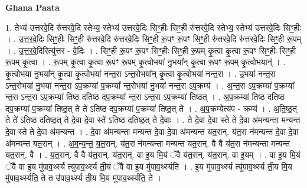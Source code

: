 \documentclass[17pt]{extarticle}
\begin{document}
\textbf{Ghana Paata } \newline

1. तेभ्य॑ उत्तरवे॒दि रु॑त्तरवे॒दि स्तेभ्य॒ स्तेभ्य॑ उत्तरवे॒दिः सिꣳ॒॒हीः सिꣳ॒॒ही रु॑त्तरवे॒दि स्तेभ्य॒ स्तेभ्य॑ उत्तरवे॒दिः सिꣳ॒॒हीः । . उ॒त्त॒र॒वे॒दिः सिꣳ॒॒हीः सिꣳ॒॒ही रु॑त्तरवे॒दि रु॑त्तरवे॒दिः सिꣳ॒॒ही रू॒पꣳ रू॒पꣳ सिꣳ॒॒ही रु॑त्तरवे॒दि रु॑त्तरवे॒दिः सिꣳ॒॒ही रू॒पम् । . उ॒त्त॒र॒वे॒दिरित्यु॑त्तर - वे॒दिः । . सिꣳ॒॒ही रू॒पꣳ रू॒पꣳ सिꣳ॒॒हीः सिꣳ॒॒ही रू॒पम् कृ॒त्वा कृ॒त्वा रू॒पꣳ सिꣳ॒॒हीः सिꣳ॒॒ही रू॒पम् कृ॒त्वा । . रू॒पम् कृ॒त्वा कृ॒त्वा रू॒पꣳ रू॒पम् कृ॒त्वोभया॑ नु॒भया᳚न् कृ॒त्वा रू॒पꣳ रू॒पम् कृ॒त्वोभयान्॑ । . कृ॒त्वोभया॑ नु॒भया᳚न् कृ॒त्वा कृ॒त्वोभया॑ नन्त॒रा ऽन्त॒रोभया᳚न् कृ॒त्वा कृ॒त्वोभया॑ नन्त॒रा । . उ॒भया॑ नन्त॒रा ऽन्त॒रोभया॑ नु॒भया॑ नन्त॒रा ऽप॒क्रम्या॑ प॒क्रम्या᳚ न्त॒रोभया॑ नु॒भया॑ नन्त॒रा ऽप॒क्रम्य॑ । . अ॒न्त॒रा ऽप॒क्रम्या॑ प॒क्रम्या᳚ न्त॒रा ऽन्त॒रा ऽप॒क्रम्या॑ तिष्ठ दतिष्ठ दप॒क्रम्या᳚ न्त॒रा ऽन्त॒रा ऽप॒क्रम्या॑ तिष्ठत् । . अ॒प॒क्रम्या॑ तिष्ठ दतिष्ठ दप॒क्रम्या॑ प॒क्रम्या॑ तिष्ठ॒त् ते ते॑ ऽतिष्ठ दप॒क्रम्या॑ प॒क्रम्या॑ तिष्ठ॒त् ते । . अ॒प॒क्रम्येत्य॑प - क्रम्य॑ । . अ॒ति॒ष्ठ॒त् ते ते॑ ऽतिष्ठ दतिष्ठ॒त् ते दे॒वा दे॒वा स्ते॑ ऽतिष्ठ दतिष्ठ॒त् ते दे॒वाः । . ते दे॒वा दे॒वा स्ते ते दे॒वा अ॑मन्यन्ता मन्यन्त दे॒वा स्ते ते दे॒वा अ॑मन्यन्त । . दे॒वा अ॑मन्यन्ता मन्यन्त दे॒वा दे॒वा अ॑मन्यन्त यत॒रान्. य॑त॒रा न॑मन्यन्त दे॒वा दे॒वा अ॑मन्यन्त यत॒रान् । . अ॒म॒न्य॒न्त॒ य॒त॒रान्. य॑त॒रा न॑मन्यन्ता मन्यन्त यत॒रान्. वै वै य॑त॒रा न॑मन्यन्ता मन्यन्त यत॒रान्. वै । . य॒त॒रान्. वै वै य॑त॒रान्. य॑त॒रान्. वा इ॒य मि॒यं ॅवै य॑त॒रान्. य॑त॒रान्. वा इ॒यम् । . वा इ॒य मि॒यं ॅवै वा इ॒य मु॑पाव॒र्थ्स्य त्यु॑पाव॒र्थ्स्य ती॒यं ॅवै वा इ॒य मु॑पाव॒र्थ्स्यति॑ । . इ॒य मु॑पाव॒र्थ्स्य त्यु॑पाव॒र्थ्स्य ती॒य मि॒य मु॑पाव॒र्थ्स्यति॒ ते त उ॑पाव॒र्थ्स्य ती॒य मि॒य मु॑पाव॒र्थ्स्यति॒ ते । \newline
\end{document}
